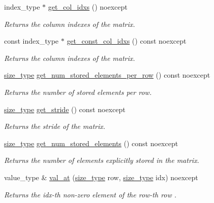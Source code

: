 \begin{DoxyCompactItemize}
index\+\_\+type $\ast$ \hyperlink{classgko_1_1matrix_1_1Ell_ac80ca9482997e97d88425214fd1b8aef}{get\+\_\+col\+\_\+idxs} () noexcept
\begin{DoxyCompactList}\small\item\em Returns the column indexes of the matrix. \end{DoxyCompactList}\item 
const index\+\_\+type $\ast$ \hyperlink{classgko_1_1matrix_1_1Ell_addb3c84f52b090c75f519833fb379cef}{get\+\_\+const\+\_\+col\+\_\+idxs} () const noexcept
\begin{DoxyCompactList}\small\item\em Returns the column indexes of the matrix. \end{DoxyCompactList}\item 
\hyperlink{namespacegko_a6e5c95df0ae4e47aab2f604a22d98ee7}{size\+\_\+type} \hyperlink{classgko_1_1matrix_1_1Ell_a08f9b04b356e58ab57d03ce335ff11ce}{get\+\_\+num\+\_\+stored\+\_\+elements\+\_\+per\+\_\+row} () const noexcept
\begin{DoxyCompactList}\small\item\em Returns the number of stored elements per row. \end{DoxyCompactList}\item 
\hyperlink{namespacegko_a6e5c95df0ae4e47aab2f604a22d98ee7}{size\+\_\+type} \hyperlink{classgko_1_1matrix_1_1Ell_a0be6e75dcea0975b10e3389a9eedacc1}{get\+\_\+stride} () const noexcept
\begin{DoxyCompactList}\small\item\em Returns the stride of the matrix. \end{DoxyCompactList}\item 
\hyperlink{namespacegko_a6e5c95df0ae4e47aab2f604a22d98ee7}{size\+\_\+type} \hyperlink{classgko_1_1matrix_1_1Ell_aecca4e9cfb1e81958881c6dc3e2aa06f}{get\+\_\+num\+\_\+stored\+\_\+elements} () const noexcept
\begin{DoxyCompactList}\small\item\em Returns the number of elements explicitly stored in the matrix. \end{DoxyCompactList}\item 
value\+\_\+type \& \hyperlink{classgko_1_1matrix_1_1Ell_a0d2365837e44dc1889fc16000ff3b0a9}{val\+\_\+at} (\hyperlink{namespacegko_a6e5c95df0ae4e47aab2f604a22d98ee7}{size\+\_\+type} row, \hyperlink{namespacegko_a6e5c95df0ae4e47aab2f604a22d98ee7}{size\+\_\+type} idx) noexcept
\begin{DoxyCompactList}\small\item\em Returns the {\ttfamily idx}-\/th non-\/zero element of the {\ttfamily row}-\/th row . \end{DoxyCompactList}\item 

\end{DoxyCompactItemize}

